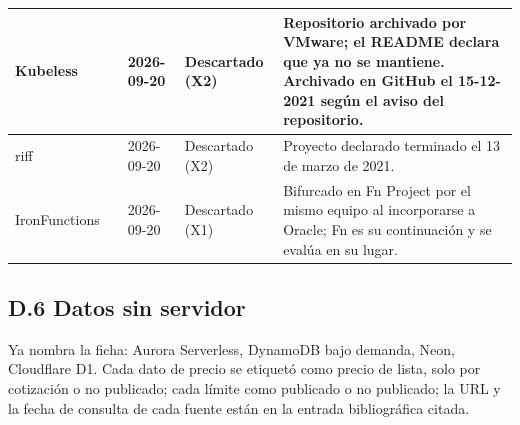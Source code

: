 \documentclass[12pt, letterpaper, table, xcdraw]{inf-pucv}
\begin{document}
{\begin{longtable}{|p{2.5cm}|p{2.4cm}|p{1.4cm}|p{2.3cm}|p{5.2cm}|}
    Kubeless & \parencite{vmware2026kubeless} & 2026-09-20 & Descartado (X2) & Repositorio archivado por VMware; el README declara que ya no se mantiene. Archivado en GitHub el 15-12-2021 según el aviso del repositorio. \\ \hline
    riff & \parencite{projectriff2021final} & 2026-09-20 & Descartado (X2) & Proyecto declarado terminado el 13 de marzo de 2021. \\ \hline
    IronFunctions & \parencite{oracle2019fnproject} & 2026-09-20 & Descartado (X1) & Bifurcado en Fn Project por el mismo equipo al incorporarse a Oracle; Fn es su continuación y se evalúa en su lugar. \\ \hline
\end{longtable}
}

\subsection*{D.6 Datos sin servidor}

Ya nombra la ficha: Aurora Serverless, DynamoDB bajo demanda, Neon, Cloudflare D1. Cada dato de precio se etiquetó como precio de lista, solo por cotización o no publicado; cada límite como publicado o no publicado; la URL y la fecha de consulta de cada fuente están en la entrada bibliográfica citada.
\end{document}
